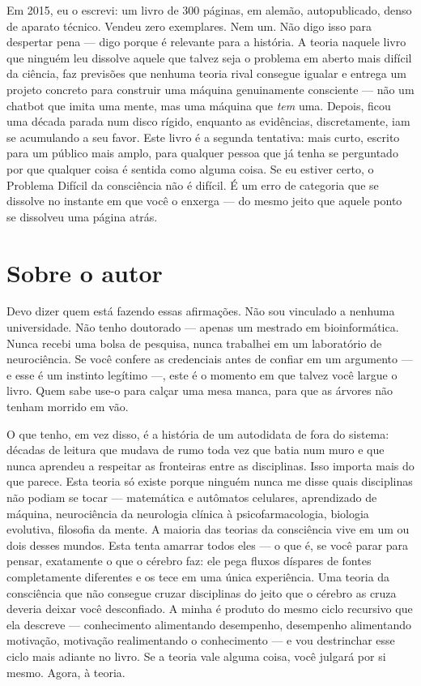 \documentclass[11pt, twoside, openright]{book}
\begin{document}
Em 2015, eu o escrevi: um livro de 300 páginas, em alemão, autopublicado, denso de aparato técnico. Vendeu zero exemplares. Nem um. Não digo isso para despertar pena --- digo porque é relevante para a história. A teoria naquele livro que ninguém leu dissolve aquele que talvez seja o problema em aberto mais difícil da ciência, faz previsões que nenhuma teoria rival consegue igualar e entrega um projeto concreto para construir uma máquina genuinamente consciente --- não um chatbot que imita uma mente, mas uma máquina que \textit{tem} uma. Depois, ficou uma década parada num disco rígido, enquanto as evidências, discretamente, iam se acumulando a seu favor. Este livro é a segunda tentativa: mais curto, escrito para um público mais amplo, para qualquer pessoa que já tenha se perguntado por que qualquer coisa é sentida como alguma coisa. Se eu estiver certo, o Problema Difícil da consciência não é difícil. É um erro de categoria que se dissolve no instante em que você o enxerga --- do mesmo jeito que aquele ponto se dissolveu uma página atrás.


\chapter*{Sobre o autor}

Devo dizer quem está fazendo essas afirmações. Não sou vinculado a nenhuma universidade. Não tenho doutorado --- apenas um mestrado em bioinformática. Nunca recebi uma bolsa de pesquisa, nunca trabalhei em um laboratório de neurociência. Se você confere as credenciais antes de confiar em um argumento --- e esse é um instinto legítimo ---, este é o momento em que talvez você largue o livro. Quem sabe use-o para calçar uma mesa manca, para que as árvores não tenham morrido em vão.

O que tenho, em vez disso, é a história de um autodidata de fora do sistema: décadas de leitura que mudava de rumo toda vez que batia num muro e que nunca aprendeu a respeitar as fronteiras entre as disciplinas. Isso importa mais do que parece. Esta teoria só existe porque ninguém nunca me disse quais disciplinas não podiam se tocar --- matemática e autômatos celulares, aprendizado de máquina, neurociência da neurologia clínica à psicofarmacologia, biologia evolutiva, filosofia da mente. A maioria das teorias da consciência vive em um ou dois desses mundos. Esta tenta amarrar todos eles --- o que é, se você parar para pensar, exatamente o que o cérebro faz: ele pega fluxos díspares de fontes completamente diferentes e os tece em uma única experiência. Uma teoria da consciência que não consegue cruzar disciplinas do jeito que o cérebro as cruza deveria deixar você desconfiado. A minha é produto do mesmo ciclo recursivo que ela descreve --- conhecimento alimentando desempenho, desempenho alimentando motivação, motivação realimentando o conhecimento --- e vou destrinchar esse ciclo mais adiante no livro. Se a teoria vale alguma coisa, você julgará por si mesmo. Agora, à teoria.
\end{document}
